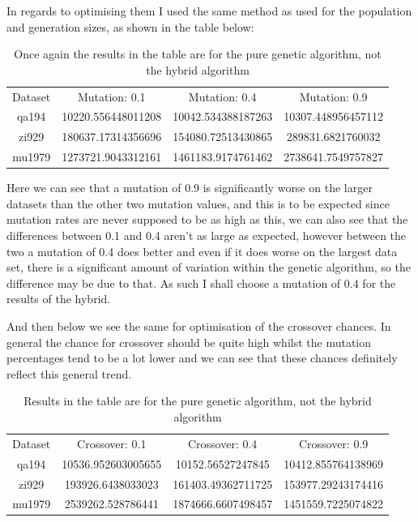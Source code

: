 \documentclass[11pt,a4paper,titlepage]{article}
\begin{document}
\pagebreak

In regards to optimising them I used the same method as used for the population and generation sizes, as shown in the table below:

\begin{table}[h]
\centering
\begin{tabular}{c | c | c | c}
Dataset & Mutation: 0.1 & Mutation: 0.4 & Mutation: 0.9 \\ [0.5ex]
\Xhline{1.5pt}
	qa194 & 10220.556448011208 & 10042.534388187263 & 10307.448956457112 \\
\hline
	zi929 & 180637.17314356696 & 154080.72513430865 & 289831.6821760032 \\
\hline
	mu1979 & 1273721.9043312161 & 1461183.9174761462 & 2738641.7549757827

\end{tabular}
\caption{Once again the results in the table are for the pure genetic algorithm, not the hybrid algorithm}
\end{table}

Here we can see that a mutation of 0.9 is significantly worse on the larger datasets than the other two mutation values, and this is to be expected since mutation rates are never supposed to be as high as this, we can also see that the differences between 0.1 and 0.4 aren't as large as expected, however between the two a mutation of 0.4 does better and even if it does worse on the largest data set, there is a significant amount of variation within the genetic algorithm, so the difference may be due to that. As such I shall choose a mutation of 0.4 for the results of the hybrid.

And then below we see the same for optimisation of the crossover chances. In general the chance for crossover should be quite high whilst the mutation percentages tend to be a lot lower and we can see that these chances definitely reflect this general trend.

\begin{table}[h]
\centering
\begin{tabular}{c | c | c | c}
Dataset & Crossover: 0.1 & Crossover: 0.4 & Crossover: 0.9 \\ [0.5ex]
\Xhline{1.5pt}
	qa194 & 10536.952603005655 & 10152.56527247845 & 10412.855764138969 \\
\hline
	zi929 & 193926.6438033023 & 161403.49362711725 & 153977.29243174416 \\
\hline
	mu1979 & 2539262.528786441 & 1874666.6607498457 & 1451559.7225074822

\end{tabular}
\caption{Results in the table are for the pure genetic algorithm, not the hybrid algorithm}
\end{table}
\end{document}
